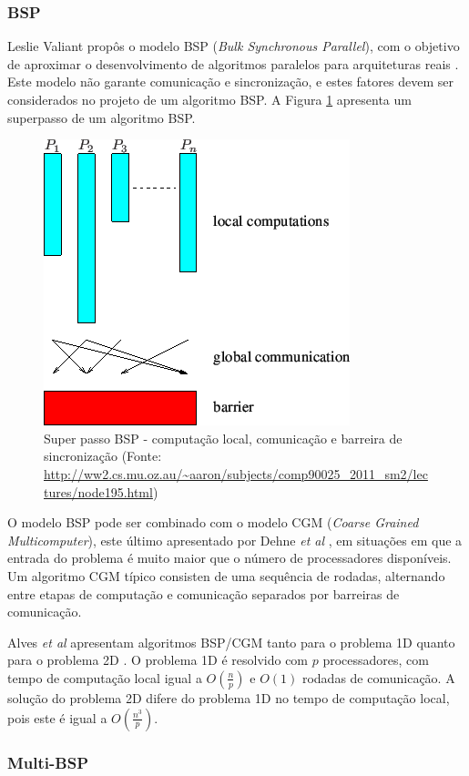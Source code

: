 \documentclass[a4paper, 12pt] {article}
\begin{document}
\subsubsection{BSP}

Leslie Valiant propôs o modelo BSP (\textit{Bulk Synchronous
Parallel}), com o objetivo de aproximar o
desenvolvimento de algoritmos paralelos para
arquiteturas reais \cite{Valiant:1990:BMP:79173.79181}. Este modelo não garante
comunicação e sincronização, e estes fatores devem ser considerados no projeto
de um algoritmo BSP. A Figura \ref{fig:bsp} apresenta um superpasso de um
algoritmo BSP.

\begin{figure}[ht]
\centering
\includegraphics[width=.35\textwidth]{bsp.png}
\caption{Super passo BSP - computação local, comunicação e barreira de
sincronização (Fonte:
\url{http://ww2.cs.mu.oz.au/~aaron/subjects/comp90025_2011_sm2/lectures/node195.html}) }
\label{fig:bsp}
\end{figure}

O modelo BSP pode ser combinado com o modelo CGM (\textit{Coarse Grained
Multicomputer}), este último apresentado por Dehne \textit{et al}
\cite{Dehne:1993:SPG:160985.161154}, em situações em que a entrada do problema é
muito maior que o número de processadores disponíveis. Um algoritmo CGM típico
consisten de uma sequência de rodadas, alternando entre etapas de computação e
comunicação separados por barreiras de comunicação.

Alves \textit{et al} apresentam algoritmos BSP/CGM tanto para o problema 1D
quanto para o problema 2D \cite{alves2004}. O problema 1D é resolvido
com $p$ processadores, com tempo de computação local igual a  $O(\frac{n}{p})$ e $O(1)$
rodadas de comunicação. A solução do problema 2D difere do problema 1D no tempo
de computação local, pois este é igual a $O(\frac{n^3}{p})$.

\subsubsection{Multi-BSP}
\end{document}

